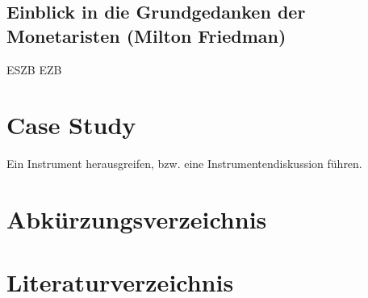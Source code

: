 \documentclass[
onecolumn,
a4paper,
abstracton,
parskip=half
,final
]{scrartcl}
\begin{document}
\subsection{Einblick in die Grundgedanken der Monetaristen (Milton Friedman)}


\clearpage
\ac{ESZB}
\ac{EZB}



\section{Case Study}
\label{sec4:CaseStudy}
Ein Instrument herausgreifen, bzw. eine Instrumentendiskussion f{\"u}hren.

\subsection{}
\subsection{}
\subsection{}











\clearpage

\section{Abk{\"u}rzungsverzeichnis}
\label{sec5:Abkuerzungsverzeichnis}

\begin{acronym}[ESZB]





\end{acronym}

\vspace{10pt}
	\newpage
\singlespacing



\section{Literaturverzeichnis}
\label{sec6:Literaturverzeichnis}

\newpage





%
\end{document}
